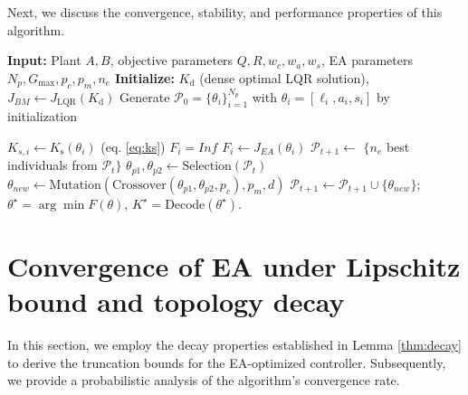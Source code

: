 \documentclass[conference]{IEEEtran}
\begin{document}
Next, we discuss the convergence, stability, and performance properties of this algorithm.

\begin{algorithm}[t]
\caption{EA-Based Sparse LQR Controller Co-Design}
\label{alg:ea}
\begin{algorithmic}[1]
\raggedright
\Statex \textbf{Input:} Plant $A, B$, objective parameters $Q, R, w_c, w_a, w_s$, 
\Statex \hspace{2em} EA parameters $N_p, G_{\max}, p_c, p_m, n_e$
\State \textbf{Initialize:} 
\Statex \hspace{2em} $K_\mathrm{d}$ (dense optimal LQR solution), $J_{BM} \gets J_\text{LQR}( K_\mathrm{d})$
\Statex \hspace{2em} Generate $\mathcal{P}_0 = \{\theta_i\}_{i=1}^{N_p}$ with $\theta_i = [\ell_i, a_i, s_i]$ by initialization\hfill

        \State $K_{s,i} \gets K_\mathrm{s}(\theta_i)$ (eq. \ref{eq:ks}) \hfill
            \State $F_i = Inf$ 
        \Else
            \State $F_i \gets \text{$J_{EA}$}(\theta_i)$ \hfill
        \EndIf
    \EndFor
    \State $\mathcal{P}_{t+1} \gets$ $\{n_e$ best individuals from $\mathcal{P}_t\}$ \hfill
        \State $\theta_{p1}, \theta_{p2} \gets \text{Selection}(\mathcal{P}_t)$
        \State $\theta_{new} \gets \text{Mutation}(\text{Crossover}(\theta_{p1}, \theta_{p2}, p_c), p_m, d)$
        \State $\mathcal{P}_{t+1} \gets \mathcal{P}_{t+1} \cup \{\theta_{new}\}$; \hfill
    \EndFor
    \hfill
\EndFor
\State \Return $\theta^\star = \arg\min F(\theta)$, $K^\star = \text{Decode}(\theta^\star)$.
\end{algorithmic}
\end{algorithm}

\section{Convergence of EA under Lipschitz bound and topology decay}
In this section, we employ the decay properties established in Lemma \ref{thm:decay} \cite{shin} to derive the truncation bounds for the EA-optimized controller. Subsequently, we provide a probabilistic analysis of the algorithm's convergence rate.
\end{document}
